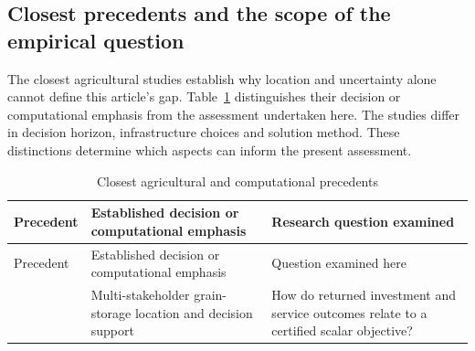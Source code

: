 \documentclass[
  english,
  11pt,
  a4paper,
  authoryear,
  preprint]{elsarticle}
\begin{document}
\subsection{Closest precedents and the scope of the empirical
question}\label{closest-precedents-and-the-scope-of-the-empirical-question}

The closest agricultural studies establish why location and uncertainty alone cannot define this article's gap.
Table~\ref{tbl-closest-precedents} distinguishes their decision or computational emphasis from the assessment undertaken here. The studies differ in decision horizon, infrastructure choices and solution method.
These distinctions determine which aspects can inform the present
assessment.

\begin{longtable}[]{@{}
  >{\raggedright\arraybackslash}p{}
  >{\raggedright\arraybackslash}p{}
  >{\raggedright\arraybackslash}p{}@{}}
\caption{Closest agricultural and computational precedents}\label{tbl-closest-precedents}\tabularnewline
\toprule\noalign{}
\begin{minipage}[b]{\linewidth}\raggedright
Precedent
\end{minipage} & \begin{minipage}[b]{\linewidth}\raggedright
Established decision or computational emphasis
\end{minipage} & \begin{minipage}[b]{\linewidth}\raggedright
Research question examined
\end{minipage} \\
\midrule\noalign{}
\endfirsthead
\toprule\noalign{}
\begin{minipage}[b]{\linewidth}\raggedright
Precedent
\end{minipage} & \begin{minipage}[b]{\linewidth}\raggedright
Established decision or computational emphasis
\end{minipage} & \begin{minipage}[b]{\linewidth}\raggedright
Question examined here
\end{minipage} \\
\midrule\noalign{}
\endhead
\bottomrule\noalign{}
\endlastfoot
\citet{essien2018} & Multi-stakeholder grain-storage location and
decision support & How do returned investment and service outcomes
relate to a certified scalar objective? \\

\end{longtable}
\end{document}
